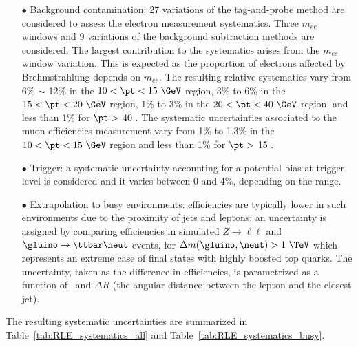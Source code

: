 \begin{itemize}
\item[$\bullet$] Background contamination: 27 variations of the tag-and-probe method are considered to assess the electron measurement systematics.
Three $m_{ee}$ windows and 9 variations of the background subtraction methods are considered.
The largest contribution to the systematics arises from the $m_{ee}$ window variation.
This is expected as the proportion of electrons affected by Brehmstrahlung depends on $m_{ee}$.
The resulting relative systematics vary from 6\% $\sim$ 12\% in the $10<\pt<15~\GeV$ region, 3\% to 6\% in the $15<\pt<20~\GeV$ region, 1\% to 3\% in the $20<\pt<40~\GeV$ region, and less than 1\% for $\pt >$ 40 \GeV.
The systematic uncertainties associated to the muon efficiencies measurement vary from 1\% to 1.3\% in the $10<\pt<15~\GeV$ region and less than 1\% for $\pt >$ 15 \GeV. 
\item[$\bullet$] Trigger: a systematic uncertainty accounting for a potential bias at trigger level is considered and it varies between 0 and 4\%, depending on the \pt range.
\item[$\bullet$] Extrapolation to busy environments: efficiencies are typically lower in such environments due to the proximity of jets and leptons; 
an uncertainty is assigned by comparing efficiencies in simulated $Z\to\ell\ell$ and $\gluino\to\ttbar\neut$ events, for $\Delta m(\gluino,\neut)>1~\TeV$ which represents an extreme case of final states with highly boosted top quarks. 
The uncertainty, taken as the difference in efficiencies, is parametrized as a function of \pt\ and $\Delta R$ (the angular distance between the lepton and the closest jet). 
\end{itemize}
The resulting systematic uncertainties are summarized in Table~\ref{tab:RLE_systematics_all} and Table~\ref{tab:RLE_systematics_busy}.
